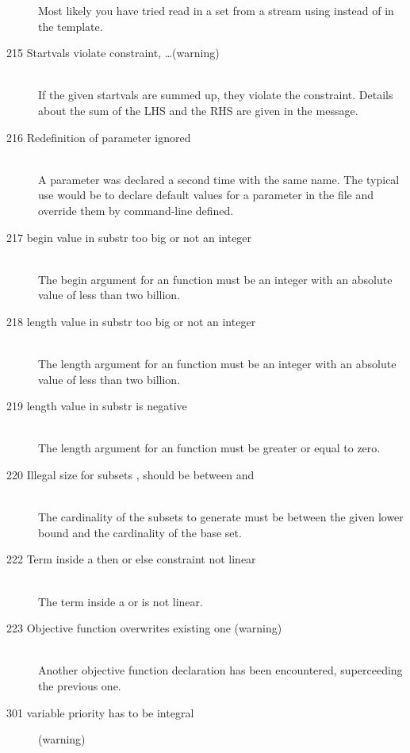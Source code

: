 \begin{description}
   Most likely you have tried read in a set from a stream using
    instead of  in the template. 
\item[215 Startvals violate constraint, \ldots (warning)]\ \\
   If the given startvals are summed up, they violate the
   constraint. Details about the sum of the LHS and the RHS are given
   in the message.
\item[216 Redefinition of parameter \code{xxx} ignored]\ \\
   A parameter was declared a second time with the same name. The
   typical use would be to declare default values for a parameter in
   the \zimpl file and override them by command-line defined.
\item[217 begin value \code{xxx} in substr too big or not an integer]\ \\
   The begin argument for an  function
   must be an integer with an absolute value of less than two billion.
\item[218 length value \code{xxx} in substr too big or not an integer]\ \\
   The length argument for an  function
   must be an integer with an absolute value of less than two billion.
\item[219 length value \code{xxx} in substr is negative]\ \\
   The length argument for an  function
   must be greater or equal to zero.
\item[220 Illegal size for subsets \code{xxx}, should be between \code{yyy} 
  and \code{zzz}]\ \\
  The cardinality of the subsets to generate must be between the
  given lower bound and the cardinality of the base set.
\item[222 Term inside a then or else constraint not linear]\ \\
  The term inside a  or  is not linear.
\item[223 Objective function \code{xxx} overwrites existing one
  (warning)]\ \\
  Another objective function declaration has been encountered,
  superceeding the previous one. 
\item[301 variable priority has to be integral] (warning)\ \\

\end{description}

